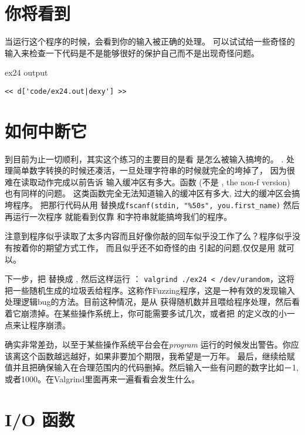 \section{你将看到}

当运行这个程序的时候，会看到你的输入被正确的处理。
可以试试给一些奇怪的输入来检查一下代码是不是能够很好的保护自己而不是出现奇怪问题。

\begin{code}{ex24 output}
\begin{lstlisting}
<< d['code/ex24.out|dexy'] >>
\end{lstlisting}
\end{code}


\section{如何中断它}

到目前为止一切顺利，其实这个练习的主要目的是看  是怎么被输入搞垮的。
. 处理简单数字转换的时候还凑活，一旦处理字符串的时候就完全的垮掉了，
因为很难在读取动作完成以前告诉 输入缓冲区有多大。函数 
(不是 , the non-f version) 也有同样的问题。 这类函数完全无法知道输入的缓冲区有多大, 过大的缓冲区会搞垮程序。
把那行代码从用 替换成\verb|fscanf(stdin, "%50s", you.first_name)| 然后再运行一次程序
就能看到仅靠 和字符串就能搞垮我们的程序。

注意到程序似乎读取了太多内容而且好像你敲的回车似乎没工作了么？程序似乎没有按着你的期望方式工作，
而且似乎还不如奇怪的由  引起的问题,仅仅是用 就可以。

下一步，把 替换成 , 然后这样运行 ：  \verb|valgrind ./ex24 < /dev/urandom|，这将把一些随机生成的垃圾丢给程序。这称作Fuzzing程序，这是一种有效的发现输入处理逻辑bug的方法。目前这种情况，是从 获得随机数并且喂给程序处理，然后看着它崩溃掉。在某些操作系统上，你可能需要多试几次，或者把 的定义改的小一点来让程序崩溃。

 确实非常差劲，以至于某些操作系统平台会在\emph{program} 运行的时候发出警告。你应该离这个函数越远越好，如果非要加个期限，我希望是一万年。
最后，继续给赋值并且把确保输入在合理范围内的代码删掉。然后输入一些有问题的数字比如－1, 或者1000。在Valgrind里面再来一遍看看会发生什么。

\section{I/O 函数}

